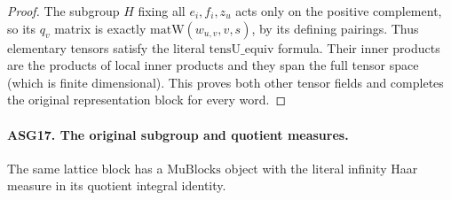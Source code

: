 \documentclass[11pt,a4paper]{article}
\numberwithin{equation}{section}
\theoremstyle{remark}\newtheorem{remark}[theorem]{Remark}
\begin{document}
\begin{proof}
The subgroup \(H\) fixing all \(e_i,f_i,z_u\) acts only on
the positive complement, so its \(q_v\) matrix is exactly
\(\mathrm{matW}(w_{u,v},v,s)\), by its defining pairings.
Thus elementary tensors satisfy the literal
\(\mathrm{tensU\_\allowbreak equiv}\) formula.  Their inner products are
the products of local inner products and they span the full tensor
space (which is finite dimensional).  This proves both other tensor
fields and completes the original representation block for every word.
\end{proof}

\paragraph{ASG17. The original subgroup and quotient measures.}
\label{claim:ASG17}
The same lattice block has a \(\mathrm{MuBlocks}\) object with
the literal infinity Haar measure in its quotient integral identity.
\end{document}
